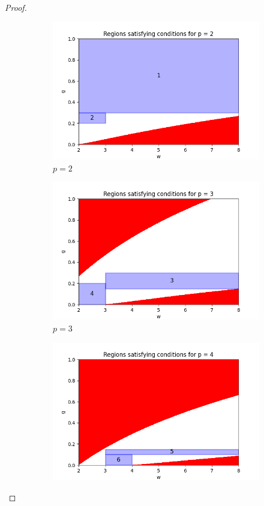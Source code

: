 \documentclass{article}
\begin{document}
\begin{proof}
\begin{figure}[ht]
    \centering
    \begin{subfigure}{0.32\textwidth}
        \includegraphics[width=\linewidth]{plotsexcom/plot_p_2.png}
        \caption{$p = 2$}
    \end{subfigure}
    \hfill
    \begin{subfigure}{0.32\textwidth}
        \includegraphics[width=\linewidth]{plotsexcom/plot_p_3.png}
        \caption{$p = 3$}
    \end{subfigure}
    \hfill
    \begin{subfigure}{0.32\textwidth}
        \includegraphics[width=\linewidth]{plotsexcom/plot_p_4.png}

\end{subfigure}
\end{figure}
\end{proof}
\end{document}
